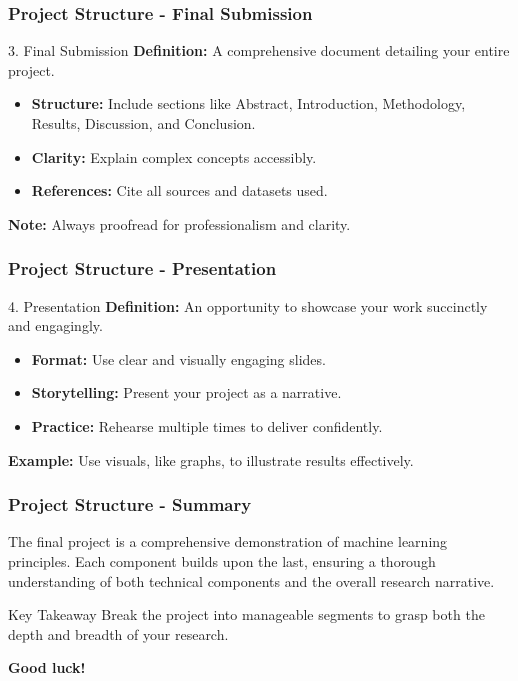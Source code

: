 \documentclass[aspectratio=169]{beamer}
\begin{document}
\begin{frame}[fragile]
    \frametitle{Project Structure - Final Submission}
    \begin{block}{3. Final Submission}
        \textbf{Definition:} A comprehensive document detailing your entire project.
    \end{block}
    \begin{itemize}
        \item \textbf{Structure:} Include sections like Abstract, Introduction, Methodology, Results, Discussion, and Conclusion.
        \item \textbf{Clarity:} Explain complex concepts accessibly.
        \item \textbf{References:} Cite all sources and datasets used.
    \end{itemize}
    \textbf{Note:} Always proofread for professionalism and clarity.
\end{frame}

\begin{frame}[fragile]
    \frametitle{Project Structure - Presentation}
    \begin{block}{4. Presentation}
        \textbf{Definition:} An opportunity to showcase your work succinctly and engagingly.
    \end{block}
    \begin{itemize}
        \item \textbf{Format:} Use clear and visually engaging slides.
        \item \textbf{Storytelling:} Present your project as a narrative.
        \item \textbf{Practice:} Rehearse multiple times to deliver confidently.
    \end{itemize}
    \textbf{Example:} Use visuals, like graphs, to illustrate results effectively.
\end{frame}

\begin{frame}[fragile]
    \frametitle{Project Structure - Summary}
    The final project is a comprehensive demonstration of machine learning principles. Each component builds upon the last, ensuring a thorough understanding of both technical components and the overall research narrative. 

    \begin{block}{Key Takeaway}
        Break the project into manageable segments to grasp both the depth and breadth of your research.
    \end{block}
    \textbf{Good luck!}
\end{frame}
\end{document}
